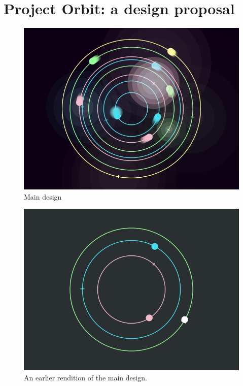 \documentclass[11pt, twocolumn]{article}
\begin{document}
\section{Project Orbit: a design proposal}


\begin{figure}[p]
\centering
\includegraphics[width=\linewidth]{explosions}
\caption{Main design}
\label{fig:explosions}
\end{figure}

\begin{figure}[p]
\centering
\includegraphics[width=\linewidth]{concept_sketch}
\caption{An earlier rendition of the main design.}
\label{fig:concept} \end{figure} 
\end{document}
